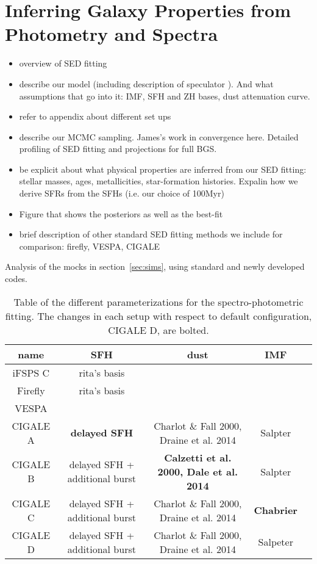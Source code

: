\section{Inferring Galaxy Properties from Photometry and Spectra} \label{sec:methods}
\begin{itemize}
    \item overview of SED fitting
    \item describe our model (including description of speculator
        \cite{alsing2020}). And what assumptions that go into it: IMF, SFH and
        ZH bases, dust attenuation curve. 
    \item refer to appendix about different set ups 
    \item describe our MCMC sampling. James's work in convergence here.
        Detailed profiling of SED fitting and projections for full BGS. 
    \item be explicit about what physical properties are inferred from our SED
        fitting: stellar masses, ages, metallicities, star-formation histories.
        Expalin how we derive SFRs from the SFHs (i.e. our choice of 100Myr) 
    \item Figure that shows the posteriors as well as the best-fit  
    \item brief description of other standard SED fitting methods we include for
        comparison: firefly, VESPA, CIGALE
\end{itemize} 

Analysis of the mocks in section~\ref{sec:sims}, using standard and newly developed codes. 

\begin{table}
\caption{Table of the different parameterizations for the spectro-photometric fitting. The changes in each setup with respect to default configuration, CIGALE D, are bolted. } 
\begin{center} 
\begin{tabular}{ccccc} \toprule
name & SFH & dust & IMF \\[3pt]
\hline 
iFSPS C & rita's basis & & \\
Firefly  & rita's basis & & \\
VESPA    & & & \\
CIGALE A & \textbf{delayed SFH} & Charlot $\&$ Fall 2000, Draine et al. 2014 & Salpter \\
CIGALE B & delayed SFH + additional burst & \textbf{Calzetti et al. 2000, Dale et al. 2014} & Salpter \\
CIGALE C & delayed SFH + additional burst & Charlot $\&$ Fall 2000, Draine et al. 2014 & \textbf{Chabrier} \\
CIGALE D & delayed SFH + additional burst & Charlot $\&$ Fall 2000, Draine et al. 2014 & Salpeter \\[3pt]
\hline            
\end{tabular} \label{tab:setups}
\end{center}
\end{table}
